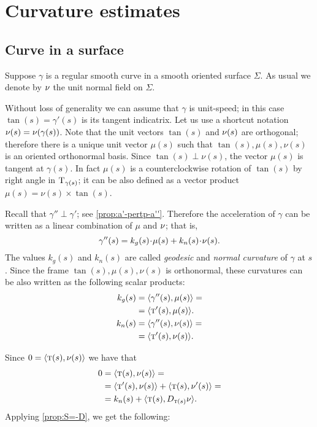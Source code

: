 \chapter{Curvature estimates}

\section*{Curve in a surface}

Suppose $\gamma$ is a regular smooth curve in a smooth oriented surface $\Sigma$.
As usual we denote by $\nu$ the unit normal field on $\Sigma$.

Without loss of generality we can assume that $\gamma$ is unit-speed;
in this case $\tan(s)=\gamma'(s)$ is its tangent indicatrix.
Let us use a shortcut notation $\nu(s)=\nu(\gamma(s))$.
Note that the unit vectors $\tan(s)$ and $\nu(s)$ are orthogonal;
therefore there is a unique unit vector $\mu(s)$ such that 
$\tan(s),\mu(s),\nu(s)$ is an oriented orthonormal basis.
Since $\tan(s)\perp\nu(s)$, the vector $\mu(s)$ is tangent at $\gamma(s)$.
In fact $\mu(s)$ is a counterclockwise rotation of $\tan(s)$ by right angle in $\mathrm{T}_{\gamma(s)}$; 
it can be also defined as a vector product $\mu(s)=\nu(s)\times \tan(s)$. %

Recall that $\gamma''\perp \gamma'$; see \ref{prop:a'-pertp-a''}.
Therefore the acceleration of $\gamma$ can be written as a linear combination of $\mu$ and $\nu$;
that is,
\[\gamma''(s)=k_g(s)\cdot \mu(s)+k_n(s)\cdot\Norm(s).\]
The values $k_g(s)$ and $k_n(s)$ are called \emph{geodesic} and \emph{normal curvature} of $\gamma$ at $s$.
Since the frame $\tan(s),\mu(s),\nu(s)$ is orthonormal, these curvatures can be also written as the following scalar products:
\begin{align*}
k_g(s)&=\langle \gamma''(s),\mu(s)\rangle
=
\\
&=\langle \textsc{t}'(s),\mu(s)\rangle.
\\
k_n(s)&=\langle \gamma''(s),\nu(s)\rangle=
\\
&=\langle \textsc{t}'(s),\nu(s)\rangle.
\end{align*}

Since $0=\langle \textsc{t}(s),\nu(s)\rangle$ we have 
that 
\begin{align*}
0&=\langle \textsc{t}(s),\nu(s)\rangle=
\\
&=\langle \textsc{t}'(s),\nu(s)\rangle+\langle \textsc{t}(s),\nu'(s)\rangle=
\\
&=k_n(s)+\langle \textsc{t}(s),D_{\textsc{t}(s)}\nu\rangle.
\end{align*}
Applying \ref{prop:S=-D},  we get the following:

